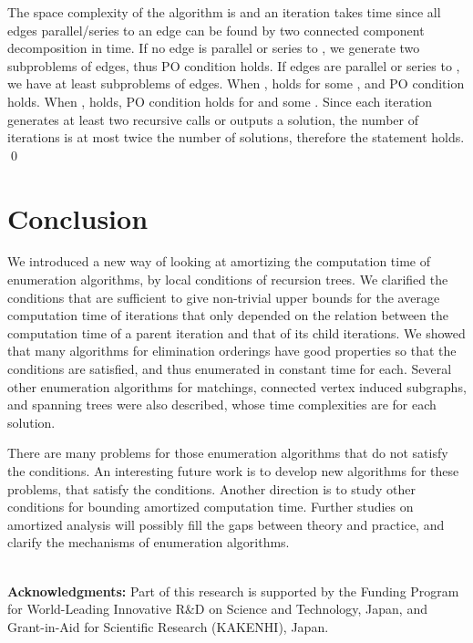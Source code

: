 \documentclass{llncs}
\begin{document}
\proof
The space complexity of the algorithm is  and an 
iteration takes  time since all edges parallel/series to
 an edge can be found by two connected
 component decomposition in  time.
If no edge is parallel or series to ,
 we generate two subproblems of  edges, thus PO condition holds.
If  edges are parallel or series to , we have at least 
 subproblems of  edges.
When ,  holds for some 
 , and PO condition holds.
When ,  holds, 
 PO condition holds for  and some .
Since each iteration generates at least two recursive calls or outputs a
 solution, the number of iterations is at most twice the number of solutions,
 therefore the statement holds.
\qed



\vspace{-2mm}
\section{Conclusion}\label{sec:cncl}
\vspace{-2mm}

We introduced a new way of looking at amortizing the computation time of 
 enumeration algorithms, by local conditions of recursion trees.
We clarified the conditions that are sufficient to give non-trivial upper 
 bounds for the average computation time of iterations that only depended
 on the relation between the computation time of a parent iteration and
  that of its child iterations.
We showed that many algorithms for elimination orderings have good
 properties so that the conditions are satisfied, and thus enumerated 
 in constant time for each.
Several other enumeration algorithms for matchings, connected vertex
 induced subgraphs, and spanning trees were also described, whose
 time complexities are  for each solution.

There are many problems for those enumeration algorithms that do not
 satisfy the conditions.
An interesting future work is to develop new algorithms for these
 problems, that satisfy the conditions.
Another direction is to study other conditions for bounding 
 amortized computation time.
Further studies on amortized analysis will possibly fill the gaps between 
 theory and practice, and clarify the mechanisms of enumeration algorithms.
 
\ \\
\noindent
{\bf \large Acknowledgments: }
Part of this research is supported by the Funding Program for World-Leading
 Innovative R\&D on Science and Technology, Japan, and Grant-in-Aid for
 Scientific Research (KAKENHI), Japan.
\end{document}
